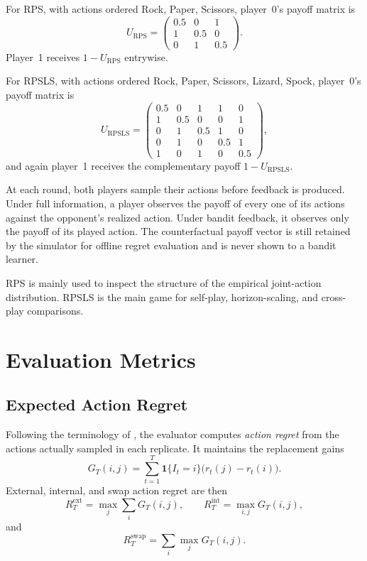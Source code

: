For RPS, with actions ordered Rock, Paper, Scissors, player~0's payoff matrix
is
\[
U_{\mathrm{RPS}}
=
\begin{pmatrix}
0.5 & 0   & 1 \\
1   & 0.5 & 0 \\
0   & 1   & 0.5
\end{pmatrix}.
\]
Player~1 receives \(1-U_{\mathrm{RPS}}\) entrywise.

For RPSLS, with actions ordered Rock, Paper, Scissors, Lizard, Spock,
player~0's payoff matrix is
\[
U_{\mathrm{RPSLS}}
=
\begin{pmatrix}
0.5 & 0   & 1   & 1   & 0 \\
1   & 0.5 & 0   & 0   & 1 \\
0   & 1   & 0.5 & 1   & 0 \\
0   & 1   & 0   & 0.5 & 1 \\
1   & 0   & 1   & 0   & 0.5
\end{pmatrix},
\]
and again player~1 receives the complementary payoff \(1-U_{\mathrm{RPSLS}}\).

At each round, both players sample their actions before feedback is produced.
Under full information, a player observes the payoff of every one of its
actions against the opponent's realized action. Under bandit feedback, it
observes only the payoff of its played action. The counterfactual payoff vector
is still retained by the simulator for offline regret evaluation and is never
shown to a bandit learner.

RPS is mainly used to inspect the structure of the empirical joint-action
distribution. RPSLS is the main game for self-play, horizon-scaling, and
cross-play comparisons.

\section{Evaluation Metrics}
\label{sec:evaluation-metrics}

\subsection{Expected Action Regret}

Following the terminology of \citet{greenwald_bounds_2006}, the evaluator
computes \emph{action regret} from the actions actually sampled in each
replicate. It maintains the replacement gains
\[
    G_T(i,j)
    =
    \sum_{t=1}^{T}
    \mathbf 1\{I_t=i\}
    \bigl(r_t(j)-r_t(i)\bigr).
\]
External, internal, and swap action regret are then
\[
    R_T^{\mathrm{ext}}
    =\max_j\sum_i G_T(i,j),
    \qquad
    R_T^{\mathrm{int}}
    =\max_{i,j}G_T(i,j),
\]
and
\[
    R_T^{\mathrm{swap}}
    =\sum_i\max_jG_T(i,j).
\]

